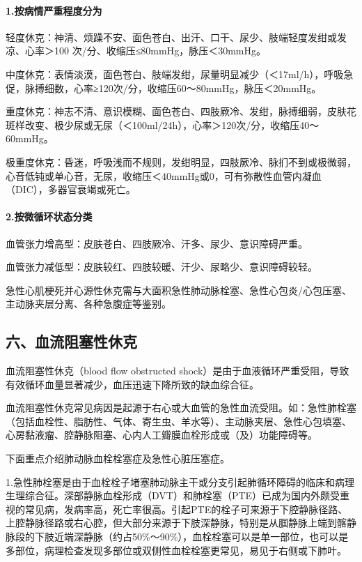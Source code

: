 \paragraph{1.按病情严重程度分为}

轻度休克：神清、烦躁不安、面色苍白、出汗、口干、尿少、肢端轻度发绀或发凉、心率＞100
次/分、收缩压≤80mmHg，脉压＜30mmHg。

中度休克：表情淡漠，面色苍白、肢端发绀，尿量明显减少（＜17ml/h），呼吸急促，脉搏细数，心率≥120次/分，收缩压60～80mmHg，脉压＜20mmHg。

重度休克：神志不清、意识模糊、面色苍白、四肢厥冷、发绀，脉搏细弱，皮肤花斑样改变、极少尿或无尿（＜100ml/24h），心率＞120次/分，收缩压40～60mmHg。

极重度休克：昏迷，呼吸浅而不规则，发绀明显，四肢厥冷、脉扪不到或极微弱，心音低钝或单心音，无尿，收缩压＜40mmHg或0，可有弥散性血管内凝血（DIC），多器官衰竭或死亡。

\paragraph{2.按微循环状态分类}

血管张力增高型：皮肤苍白、四肢厥冷、汗多、尿少、意识障碍严重。

血管张力减低型：皮肤较红、四肢较暖、汗少、尿略少、意识障碍较轻。

急性心肌梗死并心源性休克需与大面积急性肺动脉栓塞、急性心包炎/心包压塞、主动脉夹层分离、各种急腹症等鉴别。

\subsection{六、血流阻塞性休克}

血流阻塞性休克（blood flow obstructed
shock）是由于血液循环严重受阻，导致有效循环血量显著减少，血压迅速下降所致的缺血综合征。

血流阻塞性休克常见病因是起源于右心或大血管的急性血流受阻。如：急性肺栓塞（包括血栓性、脂肪性、气体、寄生虫、羊水等）、主动脉夹层、急性心包填塞、心房黏液瘤、腔静脉阻塞、心内人工瓣膜血栓形成或（及）功能障碍等。

下面重点介绍肺动脉血栓栓塞症及急性心脏压塞症。

1.急性肺栓塞是由于血栓栓子堵塞肺动脉主干或分支引起肺循环障碍的临床和病理生理综合征。深部静脉血栓形成（DVT）和肺栓塞（PTE）已成为国内外颇受重视的常见病，发病率高，死亡率很高。引起PTE的栓子可来源于下腔静脉径路、上腔静脉径路或右心腔，但大部分来源于下肢深静脉，特别是从腘静脉上端到髂静脉段的下肢近端深静脉（约占50\%～90\%），血栓栓塞可以是单一部位，也可以是多部位，病理检查发现多部位或双侧性血栓栓塞更常见，易见于右侧或下肺叶。

